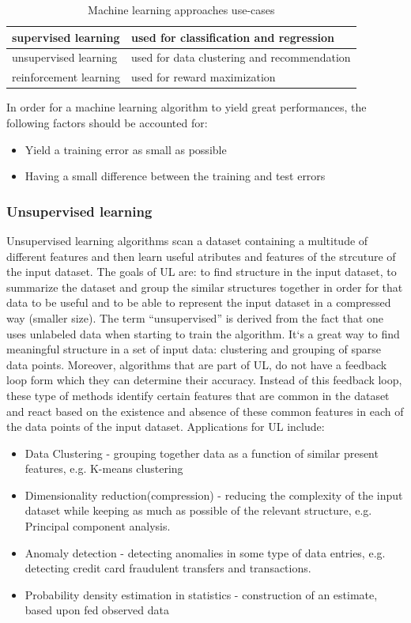 \documentclass[12pt,a4paper,twoside]{report}
\begin{document}
\begin{table}
\begin{center}
\begin{tabular}{ | m{5cm} | m{10cm}| } 
\hline
supervised learning & used for classification and regression \\
\hline
unsupervised learning & used for data clustering and recommendation \\ 
\hline
reinforcement learning & used for reward maximization \\ 
\hline
\end{tabular}
\end{center}
\caption{Machine learning approaches use-cases}
\end{table}

In order for a machine learning algorithm to yield great performances, the following factors should be accounted for:
\begin{itemize}
   \item Yield a training error as small as possible
   \item Having a small difference between the training and test errors
\end{itemize}


\subsubsection{Unsupervised learning}
Unsupervised learning algorithms scan a dataset containing a multitude of different features and then learn useful atributes and features of the strcuture of the input dataset. The goals of UL are: to find structure in the input dataset, to summarize the dataset and group the similar structures together in order for that data to be useful and to be able to represent the input dataset in a compressed way (smaller size). The term “unsupervised” is derived from the fact that one uses unlabeled data when starting to train the algorithm. It`s a great way to find meaningful structure in a set of input data: clustering and grouping of sparse data points. Moreover, algorithms that are part of UL, do not have a feedback loop form which they can determine their accuracy. Instead of this feedback loop, these type of methods identify certain features that are common in the dataset and react based on the existence and absence of these common features in each of the data points of the input dataset. Applications for UL include:
\begin{itemize}
    \item Data Clustering - grouping together data as a function of similar present features, e.g. K-means clustering
    \item Dimensionality reduction(compression) - reducing the complexity of the input dataset while keeping as much as possible of the relevant structure, e.g. Principal component analysis.
    \item Anomaly detection - detecting anomalies in some type of data entries, e.g. detecting credit card fraudulent transfers and transactions.
    \item Probability density estimation in statistics - construction of an estimate, based upon fed observed data
\end{itemize}
\end{document}
